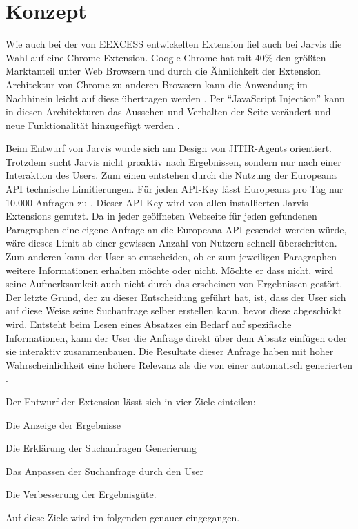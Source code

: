 \section{Konzept}
 Wie auch bei der von EEXCESS entwickelten Extension fiel auch bei Jarvis die Wahl auf eine Chrome Extension. Google Chrome hat mit 40\% den größten Marktanteil unter Web Browsern und durch die Ähnlichkeit der Extension Architektur von Chrome zu anderen Browsern kann die Anwendung im Nachhinein leicht auf diese übertragen werden \cite{schlottererweb}. Per ``JavaScript Injection'' kann in diesen Architekturen das Aussehen und Verhalten der Seite verändert und neue Funktionalität hinzugefügt werden \cite{schlottererweb}.

 Beim Entwurf von Jarvis wurde sich am Design von JITIR-Agents orientiert. Trotzdem sucht Jarvis nicht proaktiv nach Ergebnissen, sondern nur nach einer Interaktion des Users. Zum einen entstehen durch die Nutzung der Europeana API technische Limitierungen. Für jeden API-Key lässt Europeana pro Tag nur 10.000 Anfragen zu \cite{europlimit}. Dieser API-Key wird von allen installierten Jarvis Extensions genutzt. Da in jeder geöffneten Webseite für jeden gefundenen Paragraphen eine eigene Anfrage an die Europeana API gesendet werden würde, wäre dieses Limit ab einer gewissen Anzahl von Nutzern schnell überschritten. Zum anderen kann der User so entscheiden, ob er zum jeweiligen Paragraphen weitere Informationen erhalten möchte oder nicht. Möchte er dass nicht, wird seine Aufmerksamkeit auch nicht durch das erscheinen von Ergebnissen gestört. Der letzte Grund, der zu dieser Entscheidung geführt hat, ist, dass der User sich auf diese Weise seine Suchanfrage selber erstellen kann, bevor diese abgeschickt wird. Entsteht beim Lesen eines Absatzes ein Bedarf auf spezifische Informationen, kann der User die Anfrage direkt über dem Absatz einfügen oder sie interaktiv zusammenbauen. Die Resultate dieser Anfrage haben mit hoher Wahrscheinlichkeit eine höhere Relevanz als die von einer automatisch generierten \cite{rhodes2000just}.

 Der Entwurf der Extension lässt sich in vier Ziele einteilen:
 \begin{enumerate*}
 	\item Die Anzeige der Ergebnisse
  	\item Die Erklärung der Suchanfragen Generierung
 	\item Das Anpassen der Suchanfrage durch den User
 	\item Die Verbesserung der Ergebnisgüte.
\end{enumerate*}
Auf diese Ziele wird im folgenden genauer eingegangen.

